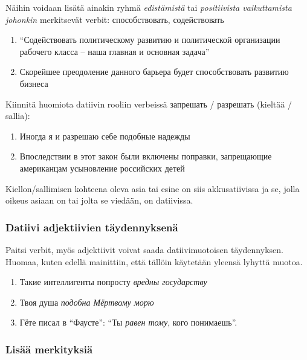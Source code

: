 \documentclass[]{scrartcl}
\providecommand{\tightlist}{%
  \setlength{\itemsep}{0pt}\setlength{\parskip}{0pt}}
\begin{document}
Näihin voidaan lisätä ainakin ryhmä \emph{edistämistä} tai
\emph{positiivista vaikuttamista johonkin} merkitsevät verbit:
способствовать, содействовать

\begin{enumerate}
\def\labelenumi{(\arabic{enumi})}
\setcounter{enumi}{23}
\tightlist
\item
  ``Содействовать политическому развитию и политической организации
  рабочего класса -- наша главная и основная задача''
\item
  Скорейшее преодоление данного барьера будет способствовать развитию
  бизнеса
\end{enumerate}

Kiinnitä huomiota datiivin rooliin verbeissä запрешать / разрешать
(kieltää / sallia):

\begin{enumerate}
\def\labelenumi{(\arabic{enumi})}
\setcounter{enumi}{25}
\tightlist
\item
  Иногда я и разрешаю себе подобные надежды
\item
  Впоследствии в этот закон были включены поправки, запрещающие
  американцам усыновление российских детей
\end{enumerate}

Kiellon/sallimisen kohteena oleva asia tai esine on siis akkusatiivissa
ja se, jolla oikeus asiaan on tai jolta se viedään, on datiivissa.

\subsubsection{Datiivi adjektiivien
täydennyksenä}\label{datiivi-adjektiivien-tuxe4ydennyksenuxe4}

Paitsi verbit, myös adjektiivit voivat saada datiivimuotoisen
täydennyksen. Huomaa, kuten edellä mainittiin, että tällöin käytetään
yleensä lyhyttä muotoa.

\begin{enumerate}
\def\labelenumi{(\arabic{enumi})}
\setcounter{enumi}{27}
\tightlist
\item
  Такие интеллигенты попросту \emph{вредны государству}
\item
  Твоя душа \emph{подобна Мёртвому морю}
\item
  Гёте писал в ``Фаусте'': ``Ты \emph{равен тому}, кого понимаешь''.
\end{enumerate}

\subsubsection{Lisää merkityksiä}\label{lisuxe4uxe4-merkityksiuxe4}
\end{document}
